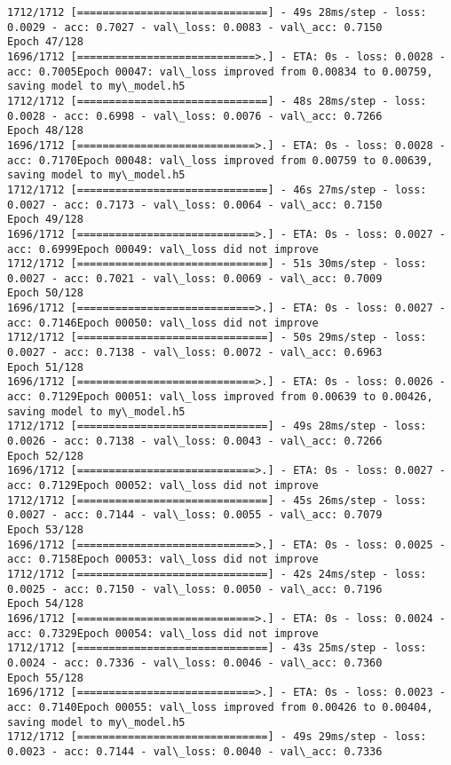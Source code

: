 \documentclass[11pt]{article}
\begin{document}
\begin{Verbatim}[commandchars=\\\{\}]
1712/1712 [==============================] - 49s 28ms/step - loss: 0.0029 - acc: 0.7027 - val\_loss: 0.0083 - val\_acc: 0.7150
Epoch 47/128
1696/1712 [============================>.] - ETA: 0s - loss: 0.0028 - acc: 0.7005Epoch 00047: val\_loss improved from 0.00834 to 0.00759, saving model to my\_model.h5
1712/1712 [==============================] - 48s 28ms/step - loss: 0.0028 - acc: 0.6998 - val\_loss: 0.0076 - val\_acc: 0.7266
Epoch 48/128
1696/1712 [============================>.] - ETA: 0s - loss: 0.0028 - acc: 0.7170Epoch 00048: val\_loss improved from 0.00759 to 0.00639, saving model to my\_model.h5
1712/1712 [==============================] - 46s 27ms/step - loss: 0.0027 - acc: 0.7173 - val\_loss: 0.0064 - val\_acc: 0.7150
Epoch 49/128
1696/1712 [============================>.] - ETA: 0s - loss: 0.0027 - acc: 0.6999Epoch 00049: val\_loss did not improve
1712/1712 [==============================] - 51s 30ms/step - loss: 0.0027 - acc: 0.7021 - val\_loss: 0.0069 - val\_acc: 0.7009
Epoch 50/128
1696/1712 [============================>.] - ETA: 0s - loss: 0.0027 - acc: 0.7146Epoch 00050: val\_loss did not improve
1712/1712 [==============================] - 50s 29ms/step - loss: 0.0027 - acc: 0.7138 - val\_loss: 0.0072 - val\_acc: 0.6963
Epoch 51/128
1696/1712 [============================>.] - ETA: 0s - loss: 0.0026 - acc: 0.7129Epoch 00051: val\_loss improved from 0.00639 to 0.00426, saving model to my\_model.h5
1712/1712 [==============================] - 49s 28ms/step - loss: 0.0026 - acc: 0.7138 - val\_loss: 0.0043 - val\_acc: 0.7266
Epoch 52/128
1696/1712 [============================>.] - ETA: 0s - loss: 0.0027 - acc: 0.7129Epoch 00052: val\_loss did not improve
1712/1712 [==============================] - 45s 26ms/step - loss: 0.0027 - acc: 0.7144 - val\_loss: 0.0055 - val\_acc: 0.7079
Epoch 53/128
1696/1712 [============================>.] - ETA: 0s - loss: 0.0025 - acc: 0.7158Epoch 00053: val\_loss did not improve
1712/1712 [==============================] - 42s 24ms/step - loss: 0.0025 - acc: 0.7150 - val\_loss: 0.0050 - val\_acc: 0.7196
Epoch 54/128
1696/1712 [============================>.] - ETA: 0s - loss: 0.0024 - acc: 0.7329Epoch 00054: val\_loss did not improve
1712/1712 [==============================] - 43s 25ms/step - loss: 0.0024 - acc: 0.7336 - val\_loss: 0.0046 - val\_acc: 0.7360
Epoch 55/128
1696/1712 [============================>.] - ETA: 0s - loss: 0.0023 - acc: 0.7140Epoch 00055: val\_loss improved from 0.00426 to 0.00404, saving model to my\_model.h5
1712/1712 [==============================] - 49s 29ms/step - loss: 0.0023 - acc: 0.7144 - val\_loss: 0.0040 - val\_acc: 0.7336

\end{Verbatim}
\end{document}
